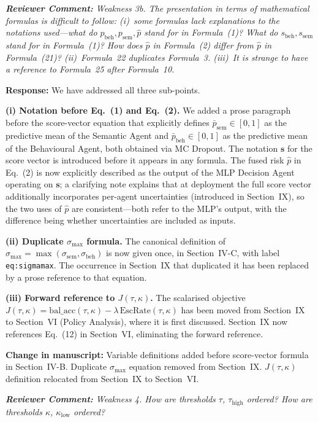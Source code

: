 \documentclass[11pt,a4paper]{article}
\newcommand{\RC}[1]{\begin{reviewbox}\textit{\textbf{Reviewer Comment:} #1}\end{reviewbox}}
\newcommand{\RS}[1]{\noindent\textcolor{responsegreen}{\textbf{Response:}} #1\par\medskip}
\newcommand{\CH}[1]{\noindent\textcolor{changebrown}{\textbf{Change in manuscript:}} #1\par\bigskip}
\begin{document}
\RC{Weakness 3b. The presentation in terms of mathematical formulas is difficult
to follow: (i)~some formulas lack explanations to the notations used---what do
$p_{\text{beh}}, p_{\text{sem}}, \hat{p}$ stand for in Formula~(1)? What do
$s_{\text{beh}}, s_{\text{sem}}$ stand for in Formula~(1)? How does $\hat{p}$ in
Formula~(2) differ from $\hat{p}$ in Formula~(21)? (ii)~Formula~22 duplicates
Formula~3. (iii)~It is strange to have a reference to Formula~25 after Formula~10.}

\RS{We have addressed all three sub-points.}

\noindent\textbf{(i) Notation before Eq.~(1) and Eq.~(2).}
We added a prose paragraph before the score-vector equation that explicitly defines
$\bar{p}_{\text{sem}} \in [0,1]$ as the predictive mean of the Semantic Agent and
$\bar{p}_{\text{beh}} \in [0,1]$ as the predictive mean of the Behavioural Agent,
both obtained via MC Dropout. The notation $\mathbf{s}$ for the score vector is
introduced before it appears in any formula. The fused risk $\hat{p}$ in Eq.~(2)
is now explicitly described as the output of the MLP Decision Agent operating on
$\mathbf{s}$; a clarifying note explains that at deployment the full score vector
additionally incorporates per-agent uncertainties (introduced in Section~IX), so
the two uses of $\hat{p}$ are consistent---both refer to the MLP's output, with
the difference being whether uncertainties are included as inputs.

\noindent\textbf{(ii) Duplicate $\sigma_{\max}$ formula.}
The canonical definition of
$\sigma_{\max} = \max(\sigma_{\text{sem}}, \sigma_{\text{beh}})$ is now given once,
in Section~IV-C, with label \texttt{eq:sigmamax}. The occurrence in Section~IX
that duplicated it has been replaced by a prose reference to that equation.

\noindent\textbf{(iii) Forward reference to $J(\tau,\kappa)$.}
The scalarised objective $J(\tau,\kappa) = \mathrm{bal\_acc}(\tau,\kappa) -
\lambda\,\mathrm{EscRate}(\tau,\kappa)$ has been moved from Section~IX to
Section~VI (Policy Analysis), where it is first discussed. Section~IX now
references Eq.~(12) in Section~VI, eliminating the forward
reference.

\CH{Variable definitions added before score-vector formula in Section~IV-B.
Duplicate $\sigma_{\max}$ equation removed from Section~IX. $J(\tau,\kappa)$
definition relocated from Section~IX to Section~VI.}

\RC{Weakness 4. How are thresholds $\tau$, $\tau_{\text{high}}$ ordered? How are
thresholds $\kappa$, $\kappa_{\text{low}}$ ordered?}
\end{document}
